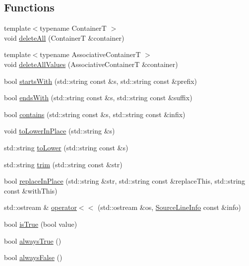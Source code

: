 \subsection*{Functions}
\begin{DoxyCompactItemize}
\item 
{\footnotesize template$<$typename ContainerT $>$ }\\void \hyperlink{namespace_catch_aadf9786550a462740ec355f8219863a9}{delete\+All} (ContainerT \&container)
\item 
{\footnotesize template$<$typename Associative\+ContainerT $>$ }\\void \hyperlink{namespace_catch_af2fcec1d4bd984fe19ff8b9a432c36a8}{delete\+All\+Values} (Associative\+ContainerT \&container)
\item 
bool \hyperlink{namespace_catch_a695f62327be0676e046291eeaae15110}{starts\+With} (std\+::string const \&s, std\+::string const \&prefix)
\item 
bool \hyperlink{namespace_catch_ada025504f627feaf9ac68ca391515dff}{ends\+With} (std\+::string const \&s, std\+::string const \&suffix)
\item 
bool \hyperlink{namespace_catch_aa52974b0e426e7e2fbd725a900e9c36e}{contains} (std\+::string const \&s, std\+::string const \&infix)
\item 
void \hyperlink{namespace_catch_a0760dbe87d090a55a35414db57d272c4}{to\+Lower\+In\+Place} (std\+::string \&s)
\item 
std\+::string \hyperlink{namespace_catch_ac036a17412d318598ffda8e1fe7a1177}{to\+Lower} (std\+::string const \&s)
\item 
std\+::string \hyperlink{namespace_catch_a084108b47f37d8bfd5db51c50c7451b3}{trim} (std\+::string const \&str)
\item 
bool \hyperlink{namespace_catch_afe4e6770da547e43e9e4eeaa05f946ea}{replace\+In\+Place} (std\+::string \&str, std\+::string const \&replace\+This, std\+::string const \&with\+This)
\item 
std\+::ostream \& \hyperlink{namespace_catch_a6ec18b5054d7fdfdde861c580b082995}{operator$<$$<$} (std\+::ostream \&os, \hyperlink{struct_catch_1_1_source_line_info}{Source\+Line\+Info} const \&info)
\item 
bool \hyperlink{namespace_catch_ae3bc6c6677e64e6eaa720dc3add31852}{is\+True} (bool value)
\item 
bool \hyperlink{namespace_catch_a129be2186a2f6546206ec52c4bf2156f}{always\+True} ()
\item 
bool \hyperlink{namespace_catch_ad425271249dd02956a9709e78b8b2783}{always\+False} ()

\end{DoxyCompactItemize}
